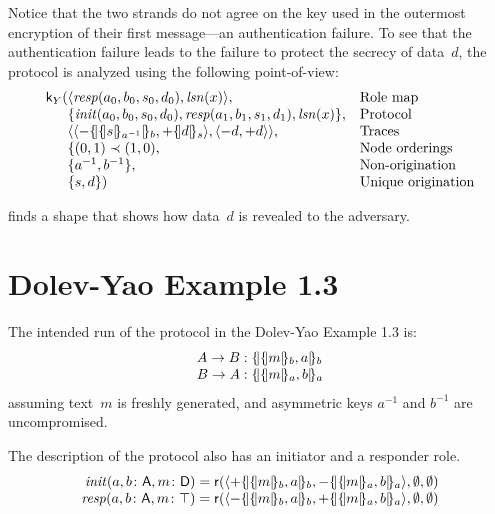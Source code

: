 \documentclass[12pt]{report}
\theoremstyle{definition}
\newcommand{\role}{\mathsf{r}}
\newcommand{\skel}{\mathsf{k}}
\newcommand{\lsn}{\fn{lsn}}
\newcommand{\init}{\fn{init}}
\newcommand{\resp}{\fn{resp}}
\begin{document}
Notice that the two strands do not agree on the key used in the outermost
encryption of their first message---an authentication failure.  To see
that the authentication failure leads to the failure to protect the
secrecy of data~$d$, the protocol is analyzed using the following
point-of-view:
$$\begin{array}{r@{}ll}
\skel_Y(
&\seq{\resp(a_0,b_0,s_0,d_0),\lsn(x)},
&\mbox{Role map}\\
&\{\init(a_0,b_0,s_0,d_0),\resp(a_1,b_1,s_1,d_1),\lsn(x)\},
&\mbox{Protocol}\\
&\seq{
\seq{\inbnd\enc{\enc{s}{a^{-1}}}{b},\outbnd\enc{d}{s}},
\seq{\inbnd d,\outbnd d}},
&\mbox{Traces}\\
&\{(0,1)\prec(1,0),
&\mbox{Node orderings}\\
&\{a^{-1},b^{-1}\},
&\mbox{Non-origination}\\
&\{s,d\})
&\mbox{Unique origination}
\end{array}$$

{\cpsa} finds a shape that shows how data~$d$ is revealed to the adversary.

\section{Dolev-Yao Example 1.3}

The intended run of the protocol in the Dolev-Yao Example 1.3 is:
$$\begin{array}{r@{{}:{}}l}
A\to B&\enc{\enc{m}{b},a}{b}\\
B\to A&\enc{\enc{m}{a},b}{a}
\end{array}$$
assuming text~$m$ is freshly generated, and asymmetric keys $a^{-1}$
and $b^{-1}$ are uncompromised.

The {\cpsa} description of the protocol also has an initiator and a
responder role.
$$\begin{array}{r@{{}={}}l}
\init(a,b\colon\srt{A}, m\colon\srt{D})&
\role(\seq{\outbnd\enc{\enc{m}{b},a}{b},\inbnd\enc{\enc{m}{a},b}{a}},
\emptyset,\emptyset)\\
\resp(a,b\colon\srt{A}, m\colon\top)&
\role(\seq{\inbnd\enc{\enc{m}{b},a}{b},\outbnd\enc{\enc{m}{a},b}{a}},
\emptyset,\emptyset)\\
\end{array}$$
\end{document}
